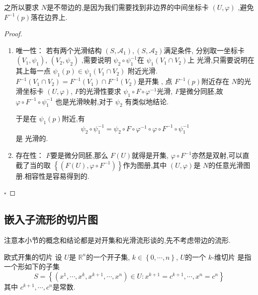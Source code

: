\documentclass[../../几何与拓扑.tex]{subfiles}
\begin{document}
\begin{note}
    之所以要求 \(  N  \)是不带边的,是因为我们需要找到非边界的中间坐标卡 \(  \left( U, \varphi  \right)   \)  ,避免 \(  F^{-1} \left( p \right)   \)落在边界上. 
\end{note}
\begin{proof}
    \begin{enumerate}
        \item 唯一性： 若有两个光滑结构 \(  \left( S, \mathcal{A}_1  \right),\left( S,\mathcal{A}_2 \right)    \)满足条件, 分别取一坐标卡  \(  \left( V_1,\psi _1  \right)   \), \(  \left( V_2,\psi _2  \right)   \)  
        ,需要说明 \(  \psi_2 \circ \psi _1 ^{-1}   \)在 \(\psi _1 \left( V_1\cap V_2 \right)   \)上 光滑,只需要说明在其上每一点 \( \psi  _1 \left( p \right) \in \psi  _1 \left( V_1\cap V_2 \right)    \) 附近光滑.  \(  F^{-1} \left( V_1\cap V_2 \right)= F^{-1} \left( V_1 \right)\cap F^{-1} \left( V_2 \right)     \)是开集 ,
        点  \(  F^{-1} \left( p \right) \)附近存在 \(  N  \)的光滑坐标卡 \(  \left( U, \varphi  \right)   \), \(  F  \)的光滑性要求 \(  \psi _1 \circ F\circ  \varphi  ^{-1}  \)光滑,  \(  F  \)是微分同胚,故 \(   \varphi \circ F^{-1} \circ \psi  _1^{-1}   \)  也是光滑映射,对于 \(  \psi _2   \) 有类似地结论.
         
         于是在 \(  \psi _1 \left( p \right)   \)附近,有 \[
         \psi _2  \circ \psi _1 ^{-1} =  \psi _2 \circ F\circ  \varphi ^{-1} \circ  \varphi \circ  F^{-1} \circ \psi _1 ^{-1} 
         \] 是 光滑的.
         
         \item 存在性： \(  F  \)要是微分同胚,那么 \(  F\left( U \right)   \)就得是开集, \(   \varphi \circ F^{-1}   \)亦然是双射,可以直截了当的取 \(  \left\{ \left( F\left( U \right), \varphi \circ F^{-1}   \right)  \right\}  \)作为图册,其中 
         \(  \left( U, \varphi  \right)   \)是 \(  N  \)的任意光滑图册.相容性是容易得到的.      
    \end{enumerate}
    

    \hfill $\square$
\end{proof}


\subsection{嵌入子流形的切片图}

注意本小节的概念和结论都是对开集和光滑流形谈的,先不考虑带边的流形.

\begin{definition}{欧式开集的切片}  
    设 \(  U  \)是 \(  \mathbb{R} ^{n}  \)的一个开子集,  \(  k \in \left\{ 0,\cdots ,n \right\}  \),  \(  U  \)的一个 \(  k  \)-维切片 \footnotemark 是指
    一个形如下的子集 \[
    S = \left\{ \left(  x^1,\cdots,x^k ,x^{k+ 1},\cdots ,x^{n} \right) \in U: x^{k+ 1}= c^{k+ 1},\cdots ,x^{n}= c^{n}  \right\}
    \]其中  \(  c^{k+ 1},\cdots ,c^{n}  \)是常数.      
    
\end{definition}
\end{document}
